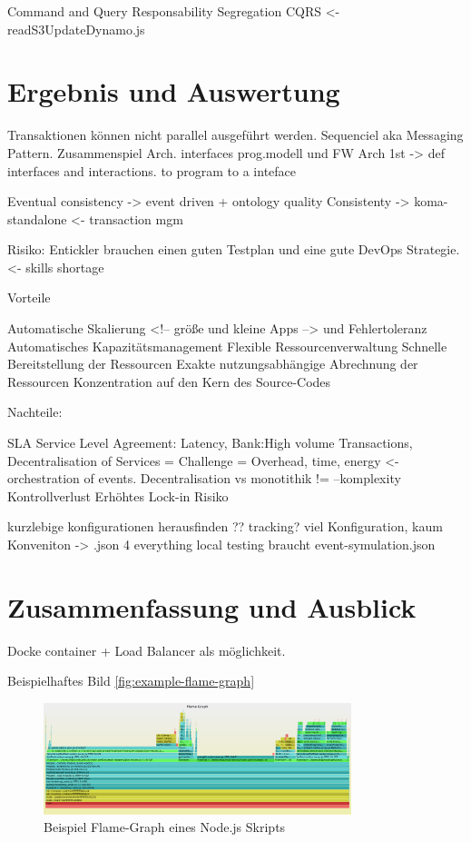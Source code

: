 \documentclass[
12pt,
english,
ngerman,
headsepline,
twoside,
openright,
numbers=noenddot,version=first
]{scrreprt}
\begin{document}
Command and Query Responsability Segregation CQRS <- readS3UpdateDynamo.js

\chapter{Ergebnis und Auswertung}
Transaktionen können nicht parallel ausgeführt werden. Sequenciel aka Messaging Pattern.
Zusammenspiel Arch. interfaces prog.modell und FW
Arch 1st -> def interfaces and interactions. to program to a inteface


Eventual consistency -> event driven + ontology quality
Consistenty -> koma-standalone <- transaction mgm

Risiko:
Entickler brauchen einen guten Testplan und eine gute DevOps Strategie.<- skills shortage

Vorteile

Automatische Skalierung <!-- größe und kleine Apps --> und Fehlertoleranz
Automatisches Kapazitätsmanagement
Flexible Ressourcenverwaltung
Schnelle Bereitstellung der Ressourcen
Exakte nutzungsabhängige Abrechnung der Ressourcen
Konzentration auf den Kern des Source-Codes

Nachteile:

SLA Service Level Agreement: Latency, Bank:High volume Transactions,
Decentralisation of Services = Challenge = Overhead, time, energy <- orchestration of events.
Decentralisation vs monotithik != --komplexity
Kontrollverlust
Erhöhtes Lock-in Risiko

kurzlebige konfigurationen herausfinden ?? tracking?
viel Konfiguration, kaum Konveniton -> .json 4 everything
local testing braucht event-symulation.json

\chapter{Zusammenfassung und Ausblick}

Docke container + Load Balancer
als möglichkeit.


Beispielhaftes Bild \autoref{fig:example-flame-graph}

\begin{figure}[h]
\centering
\includegraphics[width=0.8\textwidth]{pics/example-flame-graph.eps}
\caption{Beispiel Flame-Graph eines Node.js Skripts}
\label{fig:example-flame-graph}
\end{figure}
\end{document}
